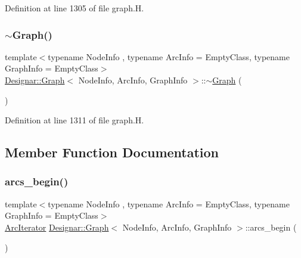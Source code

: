 Definition at line 1305 of file graph.\+H.

\mbox{\label{class_designar_1_1_graph_a2ea20f9cb46279210e1eadaebcfe27f0}} 
\subsubsection{\texorpdfstring{$\sim$\+Graph()}{~Graph()}}
{\footnotesize\ttfamily template$<$typename Node\+Info , typename Arc\+Info  = Empty\+Class, typename Graph\+Info  = Empty\+Class$>$ \\
\hyperlink{class_designar_1_1_graph}{Designar\+::\+Graph}$<$ Node\+Info, Arc\+Info, Graph\+Info $>$\+::$\sim$\hyperlink{class_designar_1_1_graph}{Graph} (\begin{DoxyParamCaption}{ }\end{DoxyParamCaption})\hspace{0.3cm}{\ttfamily [inline]}}



Definition at line 1311 of file graph.\+H.



\subsection{Member Function Documentation}
\mbox{\label{class_designar_1_1_graph_a9448ba557a7b0ef90651d74d4a4ee36b}} 
\subsubsection{\texorpdfstring{arcs\+\_\+begin()}{arcs\_begin()}\hspace{0.1cm}{\footnotesize\ttfamily [1/4]}}
{\footnotesize\ttfamily template$<$typename Node\+Info , typename Arc\+Info  = Empty\+Class, typename Graph\+Info  = Empty\+Class$>$ \\
\hyperlink{class_designar_1_1_graph_1_1_arc_iterator}{Arc\+Iterator} \hyperlink{class_designar_1_1_graph}{Designar\+::\+Graph}$<$ Node\+Info, Arc\+Info, Graph\+Info $>$\+::arcs\+\_\+begin (\begin{DoxyParamCaption}{ }\end{DoxyParamCaption})\hspace{0.3cm}{\ttfamily [inline]}}



